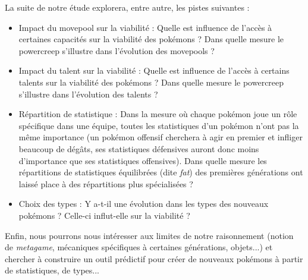 \documentclass[a4paper,12pt]{article}
\begin{document}
La suite de notre étude explorera, entre autre, les pistes suivantes :
\begin{itemize}
    \item Impact du movepool sur la viabilité : Quelle est influence de l'accès
    à certaines capacités sur la viabilité des pokémons ? Dans quelle mesure le
    powercreep s'illustre dans l'évolution des movepools ?
    \item Impact du talent sur la viabilité : Quelle est influence de l'accès à
    certains talents sur la viabilité des pokémons ? Dans quelle mesure le
    powercreep s'illustre dans l'évolution des talents ?
    \item Répartition de statistique : Dans la mesure où chaque pokémon joue un
    rôle spécifique dans une équipe, toutes les statistiques d'un pokémon n'ont
    pas la même importance (un pokémon offensif cherchera à agir en premier et
    infliger beaucoup de dégâts, ses statistiques défensives auront donc moins
    d'importance que ses statistiques offensives). Dans quelle mesure les
    répartitions de statistiques équilibrées (dite \textit{fat}) des premières
    générations ont laissé place à des répartitions plus spécialisées ?
    \item Choix des types : Y a-t-il une évolution dans les types des nouveaux
    pokémons ? Celle-ci influt-elle sur la viabilité ?
\end{itemize}

Enfin, nous pourrons nous intéresser aux limites de notre raisonnement (notion
de \textit{metagame}, mécaniques spécifiques à certaines générations, objets...)
et chercher à construire un outil prédictif pour créer de nouveaux pokémons à
partir de statistiques, de types...
\end{document}
